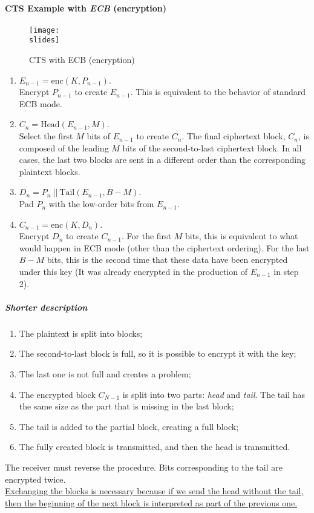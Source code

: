 \paragraph{CTS Example with \textit{ECB} (encryption)}
\begin{figure}[h]
    \centering
    \texttt{[image: \\slides]}
    \caption{CTS with ECB (encryption)}
\end{figure}
\begin{enumerate}
    \item \(E_{n-1} = \text{enc}(K, P_{n-1})\).\\
          Encrypt \(P_{n-1}\) to create \(E_{n-1}\). This is equivalent to the behavior of standard ECB mode.
    \item \(C_n = \text{Head}(E_{n-1}, M)\).\\
          Select the first \(M\) bits of \(E_{n-1}\) to create \(C_n\). The final ciphertext block, \(C_n\), is composed of the leading \(M\) bits of the second-to-last ciphertext block. In all cases, the last two blocks are sent in a different order than the corresponding plaintext blocks.
    \item \(D_n = P_n  \: || \: \text{Tail}(E_{n-1}, B-M)\).\\
          Pad \(P_n\) with the low-order bits from \(E_{n-1}\).
    \item \(C_{n-1} = \text{enc}(K, D_n)\).\\
          Encrypt \(D_n\) to create \(C_{n-1}\). For the first \(M\) bits, this is equivalent to what would happen in ECB mode (other than the ciphertext ordering). For the last \(B-M\) bits, this is the second time that these data have been encrypted under this key (It was already encrypted in the production of \(E_{n-1}\) in step 2).
\end{enumerate}



\subparagraph{Shorter description}
\begin{enumerate}
    \item The plaintext is split into blocks;
    \item The second-to-last block is full, so it is possible to encrypt it with the key;
    \item The last one is not full and creates a problem;
    \item The encrypted block $C_{N-1}$ is split into two parts: \textit{head} and \textit{tail}. The tail has the same size as the part that is missing in the last block;
    \item The tail is added to the partial block, creating a full block;
    \item The fully created block is transmitted, and then the head is transmitted.
\end{enumerate}
The receiver must reverse the procedure. Bits corresponding to the tail are encrypted twice.\\ \ul{Exchanging the blocks is necessary because if we send the head without the tail, then the beginning of the next block is interpreted as part of the previous one.}

